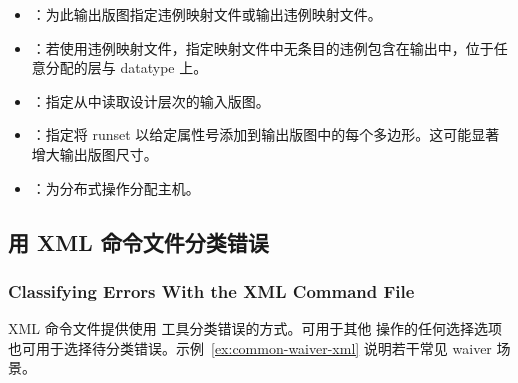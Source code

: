 \begin{itemize}
    \begin{itemize}
      \item {}：为此输出版图指定违例映射文件或输出违例映射文件。
      \item {}：若使用违例映射文件，指定映射文件中无条目的违例包含在输出中，位于任意分配的层与 datatype 上。
      \item {}：指定从中读取设计层次的输入版图。
      \item {}：指定将 runset  以给定属性号添加到输出版图中的每个多边形。这可能显著增大输出版图尺寸。
      \item {}：为分布式操作分配主机。
    \end{itemize}
\end{itemize}

\subsection{用 XML 命令文件分类错误}
\subsubsection*{Classifying Errors With the XML Command File}

XML 命令文件提供使用  工具分类错误的方式。可用于其他  操作的任何选择选项也可用于选择待分类错误。示例~\ref{ex:common-waiver-xml} 说明若干常见 waiver 场景。

